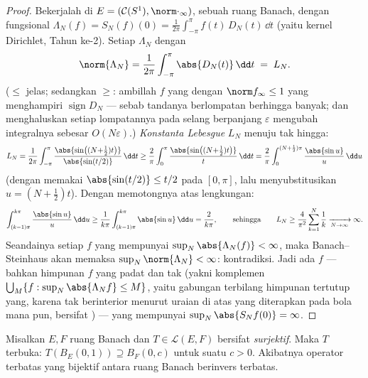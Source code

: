 \begin{proof}
Bekerjalah di $E = (\mathcal C(S^1), \norm\cdot_\infty)$, sebuah ruang
Banach, dengan fungsional $\Lambda_N(f) = S_N(f)(0) =
\frac1{2\pi}\int_{-\pi}^{\pi}f(t)\,D_N(t)\,\dd t$ (yaitu kernel
Dirichlet, Tahun ke-2). Setiap $\Lambda_N$  dengan
\[
\norm{\Lambda_N} = \frac1{2\pi}\int_{-\pi}^\pi\abs{D_N(t)}\,\dd
t \;=\; L_N .
\]
($\leq$ jelas; sedangkan $\geq$: ambillah $f$ yang  dengan $\norm f_\infty
\leq 1$ yang menghampiri $\operatorname{sign}D_N$ --- sebab tandanya
berlompatan berhingga banyak; dan menghaluskan setiap lompatannya pada selang
berpanjang $\varepsilon$ mengubah integralnya sebesar $O(N\varepsilon)$.)
\emph{Konstanta Lebesgue} $L_N$ menuju tak hingga:
\[
L_N = \frac1{2\pi}\int_{-\pi}^{\pi}
\frac{\abs{\sin\bigl((N{+}\tfrac12)t\bigr)}}{\abs{\sin(t/2)}}
\,\dd t
\geq \frac{2}{\pi}\int_0^{\pi}
\frac{\abs{\sin\bigl((N{+}\tfrac12)t\bigr)}}{t}\,\dd t
= \frac{2}{\pi}\int_0^{(N+\frac12)\pi}\frac{\abs{\sin
u}}{u}\,\dd u
\]
(dengan memakai $\abs{\sin(t/2)} \leq t/2$ pada $[0, \pi]$, lalu
menyubstitusikan $u = (N + \tfrac12)t$). Dengan memotongnya atas lengkungan:
\[
\int_{(k-1)\pi}^{k\pi}\frac{\abs{\sin u}}u\,\dd u
\geq \frac1{k\pi}\int_{(k-1)\pi}^{k\pi}\abs{\sin u}\,\dd u =
\frac{2}{k\pi},
\qquad\text{sehingga}\qquad
L_N \geq \frac{4}{\pi^2}\sum_{k=1}^N\frac1k
\xrightarrow[N\to\infty]{} \infty .
\]
Seandainya setiap $f$ yang  mempunyai $\sup_N
\abs{\Lambda_N(f)} < \infty$, maka Banach--Steinhaus akan memaksa
$\sup_N\norm{\Lambda_N} < \infty$: kontradiksi. Jadi ada $f$
--- bahkan himpunan $f$ yang padat dan tak  (yakni komplemen
$\bigcup_M\{f: \sup_N\abs{\Lambda_Nf}\leq M\}$, yaitu gabungan terbilang
himpunan tertutup yang, karena tak berinterior menurut uraian di atas yang
diterapkan pada bola mana pun, bersifat ) --- yang mempunyai $\sup_N\abs{S_Nf(0)} =
\infty$.
\end{proof}

\begin{theorem}\label{thm:b3:banach:openmapping}
Misalkan $E, F$ ruang Banach dan $T \in \mathcal L(E, F)$
bersifat \emph{surjektif}. Maka $T$ terbuka: $T(B_E(0,1)) \supseteq
B_F(0, c)$ untuk suatu $c > 0$. Akibatnya operator terbatas yang
bijektif antara ruang Banach berinvers
terbatas.
\end{theorem}

